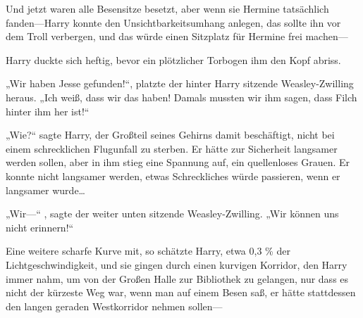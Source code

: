 Und jetzt waren alle Besensitze besetzt, aber wenn sie Hermine tatsächlich fanden—Harry konnte den Unsichtbarkeitsumhang anlegen, das sollte ihn vor dem Troll verbergen, und das würde einen Sitzplatz für Hermine frei machen—

Harry duckte sich heftig, bevor ein plötzlicher Torbogen ihm den Kopf abriss.

„Wir haben Jesse gefunden!“, platzte der hinter Harry sitzende Weasley-Zwilling heraus. „Ich weiß, dass wir das haben! Damals mussten wir ihm sagen, dass Filch hinter ihm her ist!“

„Wie?“ sagte Harry, der Großteil seines Gehirns damit beschäftigt, nicht bei einem schrecklichen Flugunfall zu sterben. Er hätte zur Sicherheit langsamer werden sollen, aber in ihm stieg eine Spannung auf, ein quellenloses Grauen. Er konnte nicht langsamer werden, etwas Schreckliches würde passieren, wenn er langsamer wurde…

„Wir—“ , sagte der weiter unten sitzende Weasley-Zwilling. „Wir können uns nicht erinnern!“

Eine weitere scharfe Kurve mit, so schätzte Harry, etwa 0,3 \% der Lichtgeschwindigkeit, und sie gingen durch einen kurvigen Korridor, den Harry immer nahm, um von der Großen Halle zur Bibliothek zu gelangen, nur dass es nicht der kürzeste Weg war, wenn man auf einem Besen saß, er hätte stattdessen den langen geraden Westkorridor nehmen sollen—

